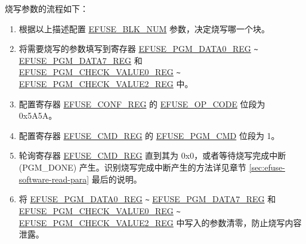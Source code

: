 \documentclass[main\_\_CN.tex]{subfiles}
\begin{document}
烧写参数的流程如下：
\begin{enumerate}
\item 根据以上描述配置 \hyperref[fielddesc:EFUSEBLKNUM]{EFUSE\_BLK\_NUM} 参数，决定烧写哪一个块。

\item 将需要烧写的参数填写到寄存器 \hyperref[regdesc:EFUSEPGMDATA0REG]{EFUSE\_PGM\_DATA0\_REG} \verb+~+ \hyperref[regdesc:EFUSEPGMDATA7REG]{EFUSE\_PGM\_DATA7\_REG} 和\\ \hyperref[regdesc:EFUSEPGMCHECKVALUE0REG]{EFUSE\_PGM\_CHECK\_VALUE0\_REG}  \verb+~+  \hyperref[regdesc:EFUSEPGMCHECKVALUE2REG]{EFUSE\_PGM\_CHECK\_VALUE2\_REG} 中。


\item 配置寄存器 \hyperref[regdesc:EFUSECONFREG]{EFUSE\_CONF\_REG} 的 \hyperref[fielddesc:EFUSEOPCODE]{EFUSE\_OP\_CODE} 位段为 0x{}5A5A。

\item 配置寄存器 \hyperref[regdesc:EFUSECMDREG]{EFUSE\_CMD\_REG} 的 \hyperref[fielddesc:EFUSEPGMCMD]{EFUSE\_PGM\_CMD} 位段为 1。

\item 轮询寄存器 \hyperref[regdesc:EFUSECMDREG]{EFUSE\_CMD\_REG} 直到其为 0x{}0，或者等待烧写完成中断 (PGM\_DONE) 产生。识别烧写完成中断产生的方法详见章节 \ref{sec:efuse-software-read-para} 最后的说明。

\item 将 \hyperref[regdesc:EFUSEPGMDATA0REG]{EFUSE\_PGM\_DATA0\_REG} \verb+~+ \hyperref[regdesc:EFUSEPGMDATA7REG]{EFUSE\_PGM\_DATA7\_REG} 和\\ \hyperref[regdesc:EFUSEPGMCHECKVALUE0REG]{EFUSE\_PGM\_CHECK\_VALUE0\_REG}  \verb+~+  \hyperref[regdesc:EFUSEPGMCHECKVALUE2REG]{EFUSE\_PGM\_CHECK\_VALUE2\_REG} 中写入的参数清零，防止烧写内容泄露。


\end{enumerate}
\end{document}
